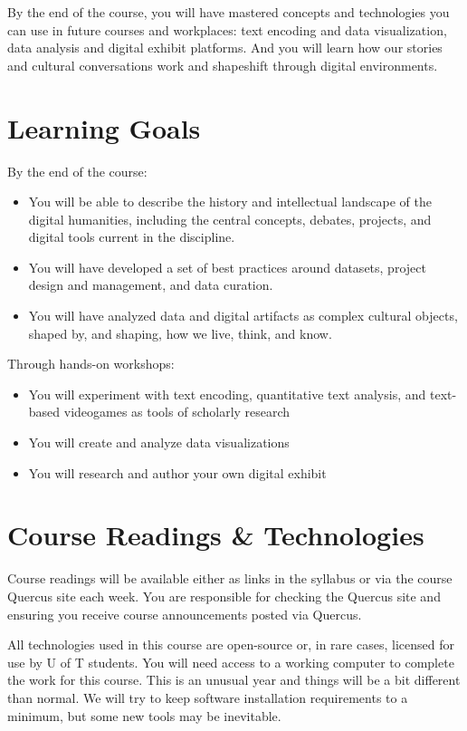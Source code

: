 \documentclass[11pt]{article}
\begin{document}
By the end of the course, you will have mastered concepts and technologies you can use in future courses and workplaces:  text encoding and data visualization, data analysis and digital exhibit platforms. And you will learn how our stories and cultural conversations work and shapeshift through digital environments.

\section*{Learning Goals}
\label{sec:orgcbb4fca}
By the end of the course:

\begin{itemize}
\item You will be able to describe the history and intellectual landscape of the digital humanities, including the central concepts, debates, projects, and digital tools current in the discipline.
\item You will have developed a set of best practices around datasets, project design and management, and data curation.
\item You will have analyzed data and digital artifacts as complex cultural objects, shaped by, and shaping, how we live, think, and know.
\end{itemize}

Through hands-on workshops:

\begin{itemize}
\item You will experiment with text encoding, quantitative text analysis, and text-based videogames as tools of scholarly research
\item You will create and analyze data visualizations
\item You will research and author your own digital exhibit
\end{itemize}

\section*{Course Readings \& Technologies}
\label{sec:org8516200}
Course readings will be available either as links in the syllabus or via the course Quercus site each week. You are responsible for checking the Quercus site and ensuring you receive course announcements posted via Quercus.

All technologies used in this course are open-source or, in rare cases, licensed for use by U of T students. You will need access to a working computer to complete the work for this course. This is an unusual year and things will be a bit different than normal. We will try to keep software installation requirements to a minimum, but some new tools may be inevitable. 
\end{document}
